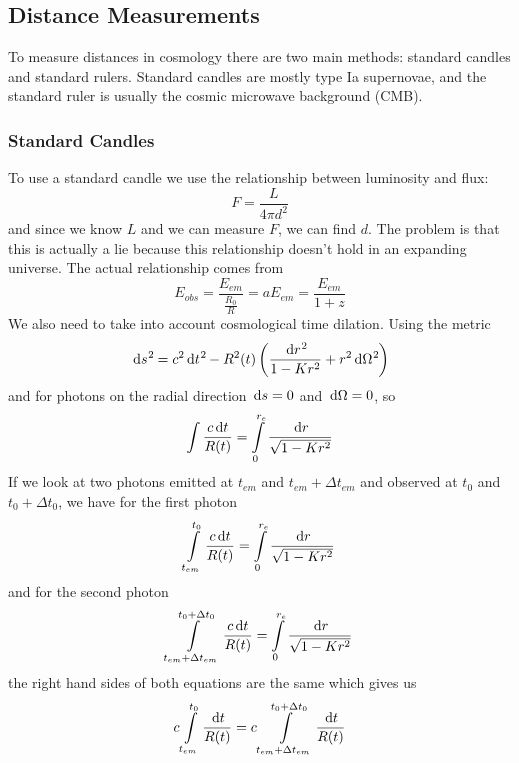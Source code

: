 \subsection{Distance Measurements}
To measure distances in cosmology there are two main methods: standard candles and standard rulers. Standard candles are mostly type Ia supernovae, and the standard ruler is usually the cosmic microwave background (CMB). 
\subsubsection{Standard Candles}
To use a standard candle we use the relationship between luminosity and flux:
\begin{equation}
    F = \frac{L}{4\pi d^2}
\end{equation}
and since we know \(L\) and we can measure \(F\), we can find \(d\). The problem is that this is actually a lie because this relationship doesn't hold in an expanding universe. The actual relationship comes from
\begin{equation}
    E_{obs} = \frac{E_{em}}{\frac{R_0}{R}} = a E_{em} = \frac{E_{em}}{1+z}
\end{equation}
We also need to take into account cosmological time dilation. Using the metric
\begin{equation}
    \dl s^2 = c^2 \dl t^2 - R^2(t) \ins{\frac{\dl r^2}{1-Kr^2} + r^2 \dl \Omega^2}
\end{equation}
and for photons on the radial direction \(\dl s = 0\) and \(\dl \Omega = 0\), so
\begin{equation}
    \int \frac{c \dl t}{R(t)} = \int\limits_0^{r_e} \frac{\dl r}{\sqrt{1-Kr^2}}
\end{equation}
If we look at two photons emitted at \(t_{em}\) and \(t_{em} + \Delta t_{em}\) and observed at \(t_0\) and \(t_0 + \Delta t_0\), we have for the first photon
\begin{equation}
    \int\limits_{t_{em}}^{t_0} \frac{c \dl t}{R(t)} = \int\limits_0^{r_e} \frac{\dl r}{\sqrt{1-Kr^2}}
\end{equation}
and for the second photon
\begin{equation}
    \int\limits_{t_{em} + \Delta t_{em}}^{t_0 + \Delta t_0} \frac{c \dl t}{R(t)} = \int\limits_0^{r_e} \frac{\dl r}{\sqrt{1-Kr^2}}
\end{equation}
the right hand sides of both equations are the same which gives us
\begin{equation}
    c \int\limits_{t_{em}}^{t_{0}} \frac{\dl t}{R(t)} = c \int\limits_{t_{em} + \Delta t_{em}}^{t_0 + \Delta t_0} \frac{\dl t}{R(t)} 
\end{equation}
